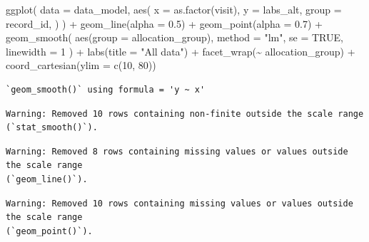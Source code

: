 \documentclass[
  letterpaper,
  DIV=11,
  numbers=noendperiod]{scrartcl}
\newenvironment{Shaded}{\begin{snugshade}}{\end{snugshade}}
\newcommand{\AttributeTok}[1]{\textcolor[rgb]{0.40,0.45,0.13}{#1}}
\newcommand{\ConstantTok}[1]{\textcolor[rgb]{0.56,0.35,0.01}{#1}}
\newcommand{\DecValTok}[1]{\textcolor[rgb]{0.68,0.00,0.00}{#1}}
\newcommand{\FloatTok}[1]{\textcolor[rgb]{0.68,0.00,0.00}{#1}}
\newcommand{\FunctionTok}[1]{\textcolor[rgb]{0.28,0.35,0.67}{#1}}
\newcommand{\NormalTok}[1]{\textcolor[rgb]{0.00,0.23,0.31}{#1}}
\newcommand{\SpecialCharTok}[1]{\textcolor[rgb]{0.37,0.37,0.37}{#1}}
\newcommand{\StringTok}[1]{\textcolor[rgb]{0.13,0.47,0.30}{#1}}
\begin{document}
\begin{Shaded}
\begin{Highlighting}[]
\FunctionTok{ggplot}\NormalTok{(}
    \AttributeTok{data =}\NormalTok{ data\_model, }
    \FunctionTok{aes}\NormalTok{(}
        \AttributeTok{x =} \FunctionTok{as.factor}\NormalTok{(visit),}
        \AttributeTok{y =}\NormalTok{ labs\_alt,}
        \AttributeTok{group =}\NormalTok{ record\_id,}
\NormalTok{    )}
\NormalTok{) }\SpecialCharTok{+}
    \FunctionTok{geom\_line}\NormalTok{(}\AttributeTok{alpha =} \FloatTok{0.5}\NormalTok{) }\SpecialCharTok{+}
    \FunctionTok{geom\_point}\NormalTok{(}\AttributeTok{alpha =} \FloatTok{0.7}\NormalTok{) }\SpecialCharTok{+}
    \FunctionTok{geom\_smooth}\NormalTok{(}
        \FunctionTok{aes}\NormalTok{(}\AttributeTok{group =}\NormalTok{ allocation\_group),}
        \AttributeTok{method =} \StringTok{"lm"}\NormalTok{,}
        \AttributeTok{se =} \ConstantTok{TRUE}\NormalTok{,}
        \AttributeTok{linewidth =} \DecValTok{1}
\NormalTok{    ) }\SpecialCharTok{+}
    \FunctionTok{labs}\NormalTok{(}\AttributeTok{title =} \StringTok{"All data"}\NormalTok{) }\SpecialCharTok{+}
    \FunctionTok{facet\_wrap}\NormalTok{(}\SpecialCharTok{\textasciitilde{}}\NormalTok{ allocation\_group) }\SpecialCharTok{+} 
    \FunctionTok{coord\_cartesian}\NormalTok{(}\AttributeTok{ylim =} \FunctionTok{c}\NormalTok{(}\DecValTok{10}\NormalTok{, }\DecValTok{80}\NormalTok{))}
\end{Highlighting}
\end{Shaded}

\begin{verbatim}
`geom_smooth()` using formula = 'y ~ x'
\end{verbatim}

\begin{verbatim}
Warning: Removed 10 rows containing non-finite outside the scale range
(`stat_smooth()`).
\end{verbatim}

\begin{verbatim}
Warning: Removed 8 rows containing missing values or values outside the scale range
(`geom_line()`).
\end{verbatim}

\begin{verbatim}
Warning: Removed 10 rows containing missing values or values outside the scale range
(`geom_point()`).
\end{verbatim}
\end{document}
